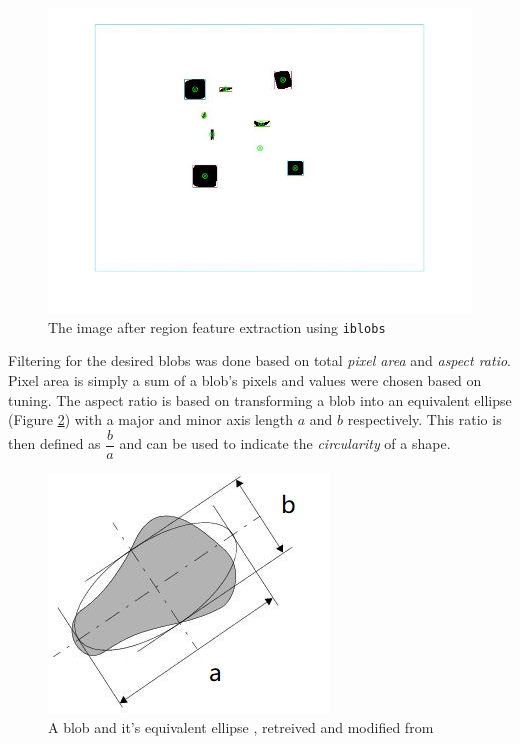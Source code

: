 \documentclass{UoNMCHA}
\numberwithin{equation}{section}
\begin{document}
\begin{figure}[H]
	\begin{center}
		\includegraphics[width=.7\linewidth]{Figures/targetobjectworkspaceblobsall}
		\caption{The image after region feature extraction using \texttt{iblobs}}
		\label{fig:tagetobjectworkspaceblobsall}
	\end{center}
\end{figure}

Filtering for the desired blobs was done based on total \textit{pixel area} and \textit{aspect ratio}. Pixel area is simply a sum of a blob's pixels and values were chosen based on tuning.
The aspect ratio is based on transforming a blob into an equivalent ellipse (Figure \ref{fig:equivalentellipse}) with a major and minor axis length $a$ and $b$ respectively. This ratio is then defined as $\dfrac{b}{a}$ and can be used to indicate the \textit{circularity} of a shape. 
\begin{figure}[H]
	\begin{center}
		\includegraphics[width=.7\linewidth]{Figures/equivalentellipse}
		\caption{A blob and it's equivalent ellipse , retreived and modified from \citep{Microscan}}
		\label{fig:equivalentellipse}
	\end{center}
\end{figure}
\end{document}
